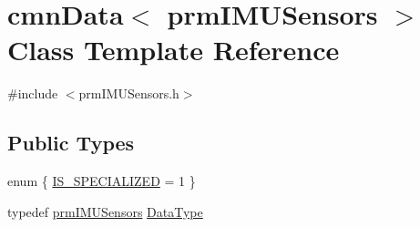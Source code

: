 \hypertarget{classcmn_data_3_01prm_i_m_u_sensors_01_4}{}\section{cmn\+Data$<$ prm\+I\+M\+U\+Sensors $>$ Class Template Reference}
\label{classcmn_data_3_01prm_i_m_u_sensors_01_4}


{\ttfamily \#include $<$prm\+I\+M\+U\+Sensors.\+h$>$}

\subsection*{Public Types}
\begin{DoxyCompactItemize}
\item 
enum \{ \hyperlink{classcmn_data_3_01prm_i_m_u_sensors_01_4_ac4ac5f3e4893a70b605283eaa0bf9963af8531318500881478a0d7d07df8ffd21}{I\+S\+\_\+\+S\+P\+E\+C\+I\+A\+L\+I\+Z\+E\+D} = 1
 \}
\item 
typedef \hyperlink{classprm_i_m_u_sensors}{prm\+I\+M\+U\+Sensors} \hyperlink{classcmn_data_3_01prm_i_m_u_sensors_01_4_a194688d7b45dc5a5b01771de9484c432}{Data\+Type}
\end{DoxyCompactItemize}
